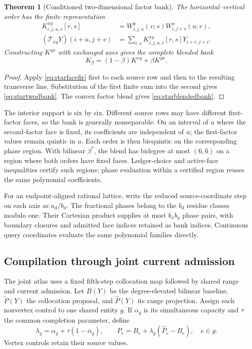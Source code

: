 \documentclass[journal]{IEEEtran}
\newtheorem{theorem}{Theorem}
\begin{document}
\begin{theorem}[Conditioned two-dimensional factor bank]
The horizontal--vertical order has the finite representation
\begin{align}
 K^{xy}_{i,j,u,v}[r,s]
 &=W^y_{i,j,u}(v;s)W^x_{i,j+s}(u;r),\nonumber\\
 (\mathcal T_{xy}Y)(i+u,j+v)
 &=\sum_{r,s}K^{xy}_{i,j,u,v}[r,s]Y_{i+r,j+s}.
 \label{eq:startwodbank}
\end{align}
Constructing $K^{yx}$ with exchanged axes gives the complete blended bank
\begin{equation}
 K_\beta=(1-\beta)K^{xy}+\beta K^{yx}.
 \label{eq:starblendedbank}
\end{equation}
\end{theorem}
\begin{proof}
Apply \eqref{eq:starfacefir} first to each source row and then to the resulting
transverse line. Substitution of the first finite sum into the second gives
\eqref{eq:startwodbank}. The convex factor blend gives
\eqref{eq:starblendedbank}.
\end{proof}

The interior support is six by six. Different source rows may have different
first-factor faces, so the bank is generally nonseparable. On an interval of
$u$ where the second-factor face is fixed, its coefficients are independent
of $u$; the first-factor values remain quintic in $u$. Each order is then
bicquintic on the corresponding phase region. With bilinear $\beta^*$, the
blend has bidegree at most $(6,6)$ on a region where both orders have fixed
faces. Ledger-choice and active-face inequalities certify such regions; phase evaluation within
a certified region reuses the same polynomial coefficients.

For an endpoint-aligned rational lattice, write the reduced source-coordinate
step on each axis as $a_d/b_d$. The fractional phases belong to the $b_d$
residue classes modulo one. Their Cartesian product supplies at most
$b_xb_y$ phase pairs, with boundary closures and admitted face indices retained
as bank indices. Continuous query coordinates evaluate the same polynomial
families directly.

\subsection{Compilation through joint current admission}
The joint atlas uses a fixed fifth-step collocation map followed by shared
range and current admission. Let $B(Y)$ be the degree-elevated bilinear
baseline, $\widetilde P(Y)$ the collocation proposal, and $\widehat P(Y)$ its
range projection. Assign each nonvertex control to one shared entity $g$.
If $\alpha_g$ is its simultaneous capacity and $\tau$ the common completion
parameter, define
\begin{equation}
 \lambda_g=\alpha_g+\tau(1-\alpha_g),\qquad
 P_e=B_e+\lambda_g(\widehat P_e-B_e),\quad e\in g.
 \label{eq:starentityweight}
\end{equation}
Vertex controls retain their source values.
\end{document}
